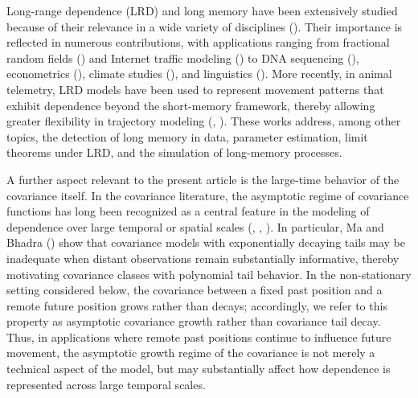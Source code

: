 \documentclass[preprint,12pt,authoryear]{elsarticle}
\begin{document}
Long-range dependence (LRD) and long memory have been extensively studied because of their relevance in a wide variety of disciplines (\cite{samo}). Their importance is reflected in numerous contributions, with applications ranging from fractional random fields (\cite{Anh1999}) and Internet traffic modeling (\cite{Karagiannis2004}) to DNA sequencing (\cite{Karmeshu2004}), econometrics (\cite{Guegan2005}), climate studies (\cite{Varotsos2006}), and linguistics (\cite{Alvarez2006}). More recently, in animal telemetry, LRD models have been used to represent movement patterns that exhibit dependence beyond the short-memory framework, thereby allowing greater flexibility in trajectory modeling (\cite{JY}, \cite{RCMS24}). These works address, among other topics, the detection of long memory in data, parameter estimation, limit theorems under LRD, and the simulation of long-memory processes.


A further aspect relevant to the present article is the large-time behavior of the covariance
itself. In the covariance literature, the asymptotic
regime of covariance functions has long been recognized as a central feature
in the modeling of dependence over large temporal or spatial scales
(\cite{GayHeyde1990}, \cite{Gneiting2000}, \cite{HaslettRaftery1989}).
In particular, Ma and Bhadra (\cite{MaBhadra2023}) show that covariance
models with exponentially decaying tails may be inadequate when distant
observations remain substantially informative, thereby motivating covariance
classes with polynomial tail behavior. In the non-stationary setting considered below, the covariance between a fixed
past position and a remote future position grows rather than decays;
accordingly, we refer to this property as asymptotic covariance growth rather
than covariance tail decay. Thus, in applications where remote past positions
continue to influence future movement, the asymptotic growth regime of the
covariance is not merely a technical aspect of the model, but may substantially
affect how dependence is represented across large temporal scales.
\end{document}
